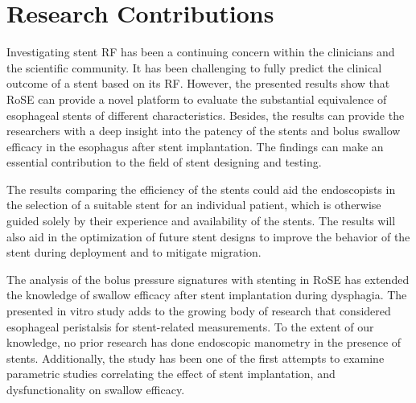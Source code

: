 \section{Research Contributions}


Investigating stent \ac{RF} has been a continuing concern within the clinicians and the scientific community. It has been challenging to fully predict the clinical outcome of a stent based on its \ac{RF}. However, the presented results show that \ac{RoSE} can provide a novel platform to evaluate the substantial equivalence of esophageal stents of different characteristics. Besides, the results can provide the researchers with a deep insight into the patency of the stents and bolus swallow efficacy in the esophagus after stent implantation. The findings can make an essential contribution to the field of stent designing and testing. 

The results comparing the efficiency of the stents could aid the endoscopists in the selection of a suitable stent for an individual patient, which is otherwise guided solely by their experience and availability of the stents. The results will also aid in the optimization of future stent designs to improve the behavior of the stent during deployment and to mitigate migration. 

The analysis of the bolus pressure signatures with stenting in \ac{RoSE} has extended the knowledge of swallow efficacy after stent implantation during dysphagia. The presented in vitro study adds to the growing body of research that considered esophageal peristalsis for stent-related measurements. To the extent of our knowledge, no prior research has done endoscopic manometry in the presence of stents.  Additionally, the study has been one of the first attempts to examine parametric studies correlating the effect of stent implantation, and dysfunctionality on swallow efficacy. 

